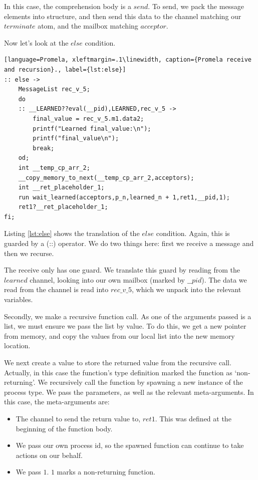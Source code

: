 \par
In this case, the comprehension body is a $send$. To send, we pack the message elements into structure, and then send this data to the channel matching our $terminate$ atom, and the mailbox matching $acceptor$.
\par
Now let's look at the $else$ condition.
\begin{lstlisting}[language=Promela, xleftmargin=.1\linewidth, caption={Promela receive and recursion}., label={lst:else}]
:: else -> 
    MessageList rec_v_5;
    do
    :: __LEARNED??eval(__pid),LEARNED,rec_v_5 -> 
        final_value = rec_v_5.m1.data2;
        printf("Learned final_value:\n");
        printf("final_value\n");
        break;
    od;
    int __temp_cp_arr_2;
    __copy_memory_to_next(__temp_cp_arr_2,acceptors);
    int __ret_placeholder_1;
    run wait_learned(acceptors,p_n,learned_n + 1,ret1,__pid,1);
    ret1?__ret_placeholder_1;
fi;
\end{lstlisting}
Listing \ref{lst:else} shows the translation of the $else$ condition. Again, this is guarded by a (::) operator. We do two things here: first we receive a message and then we recurse.
\par
The receive only has one guard. We translate this guard by reading from the $learned$ channel, looking into our own mailbox (marked by $\_\_pid$). The data we read from the channel is read into $rec\_v\_5$, which we unpack into the relevant variables.
\par
Secondly, we make a recursive function call. As one of the arguments passed is a list, we must ensure we pass the list by value. To do this, we get a new pointer from memory, and copy the values from our local list into the new memory location.
\par
We next create a value to store the returned value from the recursive call. Actually, in this case the function's type definition marked the function as `non-returning'. We recursively call the function by spawning a new instance of the process type. We pass the parameters, as well as the relevant meta-arguments. In this case, the meta-arguments are:
\begin{itemize}
    \item The channel to send the return value to, $ret1$. This was defined at the beginning of the function body.
    \item We pass our own process id, so the spawned function can continue to take actions on our behalf.
    \item We pass $1$. $1$ marks a non-returning function.
\end{itemize}
